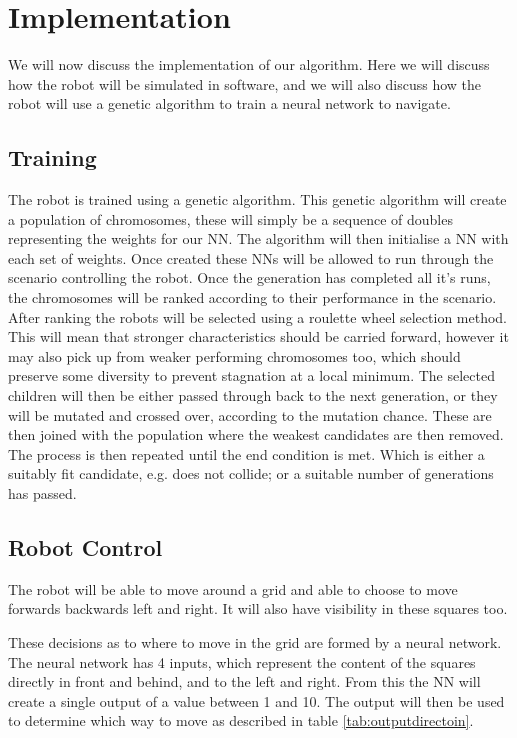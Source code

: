 \section{Implementation}
We will now discuss the implementation of our algorithm. Here we will discuss how the robot will be simulated in software, and we will also discuss how the robot will use a genetic algorithm to train a neural network to navigate.
\subsection{Training}
The robot is trained using a genetic algorithm. This genetic algorithm will create a population of chromosomes, these will simply be a sequence of doubles representing the weights for our NN. The algorithm will then initialise a NN with each set of weights. Once created these NNs will be allowed to run through the scenario controlling the robot. Once the generation has completed all it's runs, the chromosomes will be ranked according to their performance in the scenario. After ranking the robots will be selected using a roulette wheel selection method. This will mean that stronger characteristics should be carried forward, however it may also pick up from weaker performing chromosomes too, which should preserve some diversity to prevent stagnation at a local minimum. The selected children will then be either passed through back to the next generation, or they will be mutated and crossed over, according to the mutation chance. These are then joined with the population where the weakest candidates are then removed. The process is then repeated until the end condition is met. Which is either a suitably fit candidate, e.g. does not collide; or a suitable number of generations has passed.
\subsection{Robot Control}
The robot will be able to move around a grid and able to choose to move forwards backwards left and right. It will also have visibility in these squares too.

These decisions as to where to move in the grid are formed by a neural network. The neural network has 4 inputs, which represent the content of the squares directly in front and behind, and to the left and right. From this the NN will create a single output of a value between 1 and 10. The output will then be used to determine which way to move as described in table \ref{tab:outputdirectoin}.

